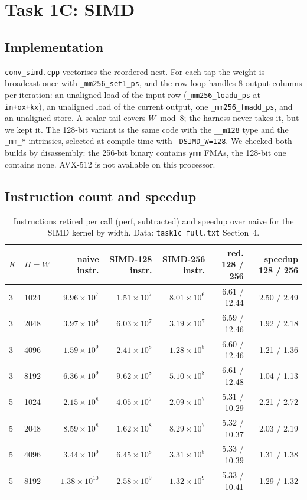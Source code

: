 \documentclass[11pt,a4paper]{article}
\begin{document}
\section{Task 1C: SIMD}

\subsection{Implementation}

{\sloppy \texttt{conv\_simd.cpp} vectorises the reordered nest. For each tap the weight is broadcast once with \texttt{\_mm256\_set1\_ps}, and the row loop handles 8 output columns per iteration: an unaligned load of the input row (\texttt{\_mm256\_loadu\_ps} at \texttt{in+ox+kx}), an unaligned load of the current output, one \texttt{\_mm256\_fmadd\_ps}, and an unaligned store. A scalar tail covers $W \bmod 8$; the harness never takes it, but we kept it. The 128-bit variant is the same code with the \texttt{\_\_m128} type and the \texttt{\_mm\_*} intrinsics, selected at compile time with \texttt{-DSIMD\_W=128}. We checked both builds by disassembly: the 256-bit binary contains \texttt{ymm} FMAs, the 128-bit one contains none. AVX-512 is not available on this processor.\par}

\subsection{Instruction count and speedup}

\begin{table}[H]
\centering\footnotesize
\caption{Instructions retired per call (perf, subtracted) and speedup over naive for the SIMD kernel by width. Data: \texttt{task1c\_full.txt} Section~4.}
\label{tab:1c}
\begin{tabular}{l l rrr rr}
\toprule
$K$ & $H=W$ & naive instr. & SIMD-128 instr. & SIMD-256 instr. & red. 128 / 256 & speedup 128 / 256 \\
\midrule
3 & 1024 & $9.96\times10^{7}$ & $1.51\times10^{7}$ & $8.01\times10^{6}$ & 6.61 / 12.44 & 2.50 / 2.49 \\
3 & 2048 & $3.97\times10^{8}$ & $6.03\times10^{7}$ & $3.19\times10^{7}$ & 6.59 / 12.46 & 1.92 / 2.18 \\
3 & 4096 & $1.59\times10^{9}$ & $2.41\times10^{8}$ & $1.28\times10^{8}$ & 6.60 / 12.46 & 1.21 / 1.36 \\
3 & 8192 & $6.36\times10^{9}$ & $9.62\times10^{8}$ & $5.10\times10^{8}$ & 6.61 / 12.48 & 1.04 / 1.13 \\
5 & 1024 & $2.15\times10^{8}$ & $4.05\times10^{7}$ & $2.09\times10^{7}$ & 5.31 / 10.29 & 2.21 / 2.72 \\
5 & 2048 & $8.59\times10^{8}$ & $1.62\times10^{8}$ & $8.29\times10^{7}$ & 5.32 / 10.37 & 2.03 / 2.19 \\
5 & 4096 & $3.44\times10^{9}$ & $6.45\times10^{8}$ & $3.31\times10^{8}$ & 5.33 / 10.39 & 1.31 / 1.38 \\
5 & 8192 & $1.38\times10^{10}$ & $2.58\times10^{9}$ & $1.32\times10^{9}$ & 5.33 / 10.41 & 1.29 / 1.32 \\
\bottomrule
\end{tabular}
\end{table}
\end{document}
